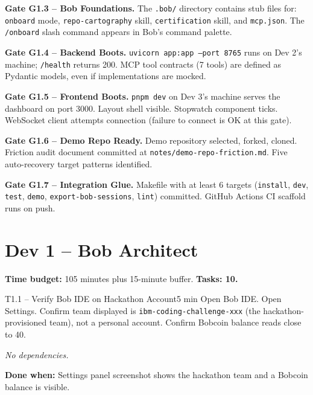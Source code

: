 \documentclass[11pt,letterpaper]{article}
\newcommand{\acceptance}[1]{\par\smallskip\textcolor{ibmgreen}{\textbf{Done when:}} #1}
\newcommand{\nodep}{\par\smallskip\textcolor{ibmgray}{\textit{No dependencies.}}}
\begin{document}
\begin{gate}
\textbf{Gate G1.3 -- Bob Foundations.} The \texttt{.bob/} directory contains stub files for: \texttt{onboard} mode, \texttt{repo-cartography} skill, \texttt{certification} skill, and \texttt{mcp.json}. The \texttt{/onboard} slash command appears in Bob's command palette.
\end{gate}

\begin{gate}
\textbf{Gate G1.4 -- Backend Boots.} \texttt{uvicorn app:app --port 8765} runs on Dev 2's machine; \texttt{/health} returns 200. MCP tool contracts (7 tools) are defined as Pydantic models, even if implementations are mocked.
\end{gate}

\begin{gate}
\textbf{Gate G1.5 -- Frontend Boots.} \texttt{pnpm dev} on Dev 3's machine serves the dashboard on port 3000. Layout shell visible. Stopwatch component ticks. WebSocket client attempts connection (failure to connect is OK at this gate).
\end{gate}

\begin{gate}
\textbf{Gate G1.6 -- Demo Repo Ready.} Demo repository selected, forked, cloned. Friction audit document committed at \texttt{notes/demo-repo-friction.md}. Five auto-recovery target patterns identified.
\end{gate}

\begin{gate}
\textbf{Gate G1.7 -- Integration Glue.} Makefile with at least 6 targets (\texttt{install}, \texttt{dev}, \texttt{test}, \texttt{demo}, \texttt{export-bob-sessions}, \texttt{lint}) committed. GitHub Actions CI scaffold runs on push.
\end{gate}

\section{Dev 1 -- Bob Architect}

\textbf{Time budget:} 105 minutes plus 15-minute buffer. \textbf{Tasks: 10.}

\begin{task}{T1.1 -- Verify Bob IDE on Hackathon Account}{5 min}
Open Bob IDE. Open Settings. Confirm team displayed is \texttt{ibm-coding-challenge-xxx} (the hackathon-provisioned team), not a personal account. Confirm Bobcoin balance reads close to 40.
\nodep
\acceptance{Settings panel screenshot shows the hackathon team and a Bobcoin balance is visible.}
\end{task}
\end{document}

